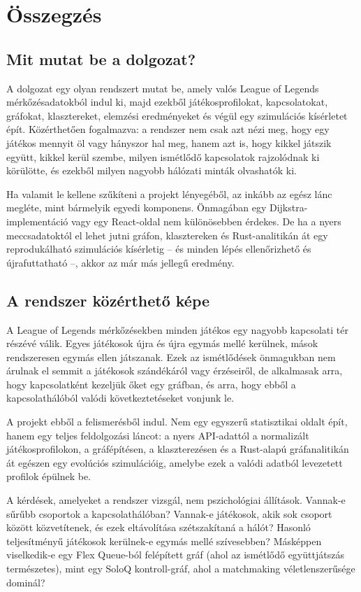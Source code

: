 \chapter{Összegzés}

\section{Mit mutat be a dolgozat?}

A dolgozat egy olyan rendszert mutat be, amely valós League of Legends mérkőzésadatokból indul ki,
majd ezekből játékosprofilokat, kapcsolatokat, gráfokat, klasztereket, elemzési eredményeket és
végül egy szimulációs kísérletet épít. Közérthetően fogalmazva: a rendszer nem csak azt nézi meg,
hogy egy játékos mennyit öl vagy hányszor hal meg, hanem azt is, hogy kikkel játszik együtt,
kikkel kerül szembe, milyen ismétlődő kapcsolatok rajzolódnak ki körülötte, és ezekből milyen
nagyobb hálózati minták olvashatók ki.

Ha valamit le kellene szűkíteni a projekt lényegéből, az inkább az egész lánc megléte, mint bármelyik egyedi komponens. Önmagában egy Dijkstra-implementáció vagy egy React-oldal nem különösebben érdekes. De ha a nyers meccsadatoktól el lehet jutni gráfon, klasztereken és Rust-analitikán át egy reprodukálható szimulációs kísérletig -- és minden lépés ellenőrizhető és újrafuttatható --, akkor az már más jellegű eredmény.

\section{A rendszer közérthető képe}

A League of Legends mérkőzésekben minden játékos egy nagyobb kapcsolati tér részévé válik.
Egyes játékosok újra és újra egymás mellé kerülnek, mások rendszeresen egymás ellen játszanak.
Ezek az ismétlődések önmagukban nem árulnak el semmit a játékosok szándékáról vagy érzéseiről,
de alkalmasak arra, hogy kapcsolatként kezeljük őket egy gráfban, és arra, hogy ebből a
kapcsolathálóból valódi következtetéseket vonjunk le.

A projekt ebből a felismerésből indul. Nem egy egyszerű statisztikai oldalt épít, hanem egy
teljes feldolgozási láncot: a nyers API-adattól a normalizált játékosprofilokon, a gráfépítésen,
a klaszterezésen és a Rust-alapú gráfanalitikán át egészen egy evolúciós szimulációig, amelybe
ezek a valódi adatból levezetett profilok épülnek be.

A kérdések, amelyeket a rendszer vizsgál, nem pszichológiai állítások. Vannak-e sűrűbb csoportok
a kapcsolathálóban? Vannak-e játékosok, akik sok csoport között közvetítenek, és ezek eltávolítása
szétszakítaná a hálót? Hasonló teljesítményű játékosok kerülnek-e egymás mellé szívesebben?
Másképpen viselkedik-e egy Flex Queue-ból felépített gráf (ahol az ismétlődő együttjátszás
természetes), mint egy SoloQ kontroll-gráf, ahol a matchmaking véletlenszerűsége dominál?

